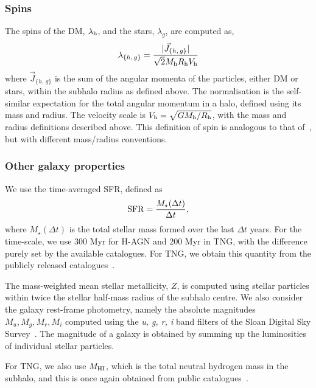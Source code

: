 \documentclass[usenatbib,useAMS]{mnras}
\begin{document}
\subsubsection{Spins}

The spins of the \ac{DM}, $\lambda_{\rm h}$, and the stars, $\lambda_g$, are computed as,
\begin{equation}
    \lambda_{\{h,\,g\}} = \frac{|\Vec{J}_{\{h,\,g\}}|}{\sqrt{2}M_{\rm h}R_{\rm h}V_{\rm h}}
\end{equation}
where $\Vec{J}_{\{h,\,g\}}$ is the sum of the angular momenta of the particles, either \ac{DM} or stars, within the subhalo radius as defined above. The normalisation is the self-similar expectation for the total angular momentum in a halo, defined using its mass and radius. The velocity scale is $V_{\rm h} = \sqrt{GM_{\rm h}/R_{\rm h}}$, with the mass and radius definitions described above. This definition of spin is analogous to that of~\citet{Bullock_2001}, but with different mass/radius conventions.

\subsubsection{Other galaxy properties}\label{sec:other_gal_props}

We use the time-averaged SFR, defined as
% 
\begin{equation}
    {\rm SFR} = \frac{M_\star(\Delta t)}{\Delta t},
\end{equation}
% 
where $M_\star(\Delta t)$ is the total stellar mass formed over the last $\Delta t$ years. For the time-scale, we use $300$ Myr for H-AGN and $200$ Myr in TNG, with the difference purely set by the available catalogues. For TNG, we obtain this quantity from the publicly released catalogues~\citep{Donnari_2019, Pillepich_2019}.

The mass-weighted mean stellar metallicity, $Z$, is computed using stellar particles within twice the stellar half-mass radius of the subhalo centre. We also consider the galaxy rest-frame photometry, namely the absolute magnitudes $M_u, M_g, M_r, M_i$ computed using the \textit{u, g, r, i} band filters of the Sloan Digital Sky Survey~\citep{Kaviraj_2017,Laigle_2019}. The magnitude of a galaxy is obtained by summing up the luminosities of individual stellar particles.

For TNG, we also use $M_{\rm HI}$, which is the total neutral hydrogen mass in the subhalo, and this is once again obtained from public catalogues~\citep{Diemer_2018,Diemer_2019}.
\end{document}

